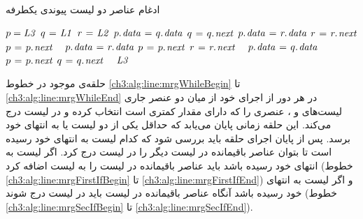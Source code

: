 \begin{algorithm}
\caption{ادغام عناصر دو لیست پیوندی یکطرفه}\label{ch3:alg:merge}
\begin{latin}
\begin{algorithmic}[1]
			\State	{}
			\State	$p = \mathit{L3}$		
			\State	$q \mathrel{\hspace{1pt}=\hspace{1pt}} \mathit{L1}$
			\State	$r \mathrel{\hspace{1pt}=\hspace{1pt}} \mathit{L2}$	
			\label{ch3:alg:line:mrgWhileBegin}
					\State	{}
							\State	$p.\hspace*{1pt}\mathit{data} \mathrel{\hspace{1pt}=\hspace{1pt}} q.\hspace*{1pt}\mathit{data}$
							\State	$q \mathrel{\hspace{1pt}=\hspace{1pt}} q.\hspace*{1pt}\mathit{next}$
					\Else
							\State	$p.\hspace*{1pt}\mathit{data} \mathrel{\hspace{1pt}=\hspace{1pt}} r.\hspace*{1pt}\mathit{data}$
							\State	$r \mathrel{\hspace{1pt}=\hspace{1pt}} r.\hspace*{1pt}\mathit{next}$								
					\EndIf
					\State	$p \mathrel{\hspace{1pt}=\hspace{1pt}} p.\hspace*{1pt}\mathit{next}$
			\EndWhile\ \label{ch3:alg:line:mrgWhileEnd}
			\label{ch3:alg:line:mrgFirstIfBegin}
							\State	$p.\hspace*{1pt}\mathit{data} \mathrel{\hspace{1pt}=\hspace{1pt}} r.\hspace*{1pt}\mathit{data}$
									\State	\bcall{New}{$\attrib{p}{next}$}
									\State	$p \mathrel{\hspace{1pt}=\hspace{1pt}} p.\hspace*{1pt}\mathit{next}$
							\EndIf
							\State	$r \mathrel{\hspace{1pt}=\hspace{1pt}} r.\hspace*{1pt}\mathit{next}$
					\EndWhile
			\EndIf\ \label{ch3:alg:line:mrgFirstIfEnd}
			\label{ch3:alg:line:mrgSecIfBegin}
					\While{$q \neq \const{null}$}
							\State	$p.\hspace*{1pt}\mathit{data} \mathrel{\hspace{1pt}=\hspace{1pt}} q.\hspace*{1pt}\mathit{data}$
							\If{$\attrib{q}{next} \neq \const{null}$}
									\State	{}
									\State	$p \mathrel{\hspace{1pt}=\hspace{1pt}} p.\hspace*{1pt}\mathit{next}$
							\EndIf
							\State	$q \mathrel{\hspace{1pt}=\hspace{1pt}} q.\hspace*{1pt}\mathit{next}$
					\EndWhile
			\EndIf\ \label{ch3:alg:line:mrgSecIfEnd}	
		\State	\Return $\mathit{L3}$
\EndFunction
\end{algorithmic}
\end{latin}
\end{algorithm}

حلقه‌ی {} موجود در خطوط {\ref{ch3:alg:line:mrgWhileBegin}} تا {\ref{ch3:alg:line:mrgWhileEnd}} در هر دور از اجرای خود از میان دو عنصر جاری لیست‌های {} و {}، عنصری را که دارای مقدار کمتری است انتخاب کرده و در لیست {} درج می‌کند. این حلقه زمانی پایان می‌یابد که حداقل یکی از دو لیست {} یا {} به انتهای خود برسد. پس از پایان اجرای حلقه باید بررسی شود که کدام لیست به انتهای خود رسیده است تا بتوان عناصر باقیمانده در لیست دیگر را در لیست {} درج کرد. اگر لیست {} به انتهای خود رسیده باشد باید عناصر باقیمانده در لیست {} را به لیست {} اضافه کرد (خطوط {\ref{ch3:alg:line:mrgFirstIfBegin}} تا {\ref{ch3:alg:line:mrgFirstIfEnd}}) و اگر لیست {} به انتهای خود رسیده باشد آنگاه عناصر باقیمانده در لیست {} باید در لیست {} درج شوند (خطوط {\ref{ch3:alg:line:mrgSecIfBegin}} تا {\ref{ch3:alg:line:mrgSecIfEnd}}).

